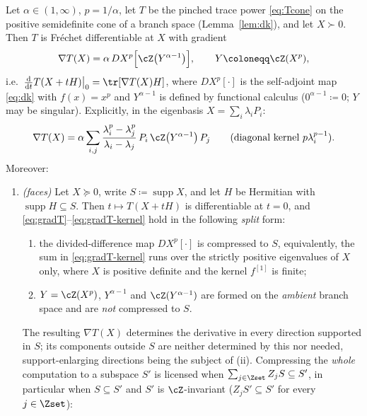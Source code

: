 \begin{theorem}\label{thm:gradient}
Let $\alpha\in(1,\infty)$, $p=1/\alpha$, let $T$ be the pinched trace
power \eqref{eq:Tcone} on the positive semidefinite cone of a branch space
(Lemma~\ref{lem:dk}), and let $X\succ0$. Then $T$ is Fr\'echet
differentiable at $X$ with gradient
\begin{equation}\label{eq:gradT}
  \nabla T(X)
  =\alpha\,D X^{p}\Big[\cZ\big(Y^{\alpha-1}\big)\Big],
  \qquad Y\coloneqq\cZ(X^{p}),
\end{equation}
i.e.\ $\frac{\mathrm d}{\mathrm dt}T(X+tH)\big|_0=\tr[\nabla T(X)H]$,
where $DX^{p}[\cdot]$ is the self-adjoint map \eqref{eq:dk} with
$f(x)=x^{p}$ and $Y^{\alpha-1}$ is defined by functional calculus
($0^{\alpha-1}\coloneqq0$; $Y$ may be singular). Explicitly, in the
eigenbasis $X=\sum_i\lambda_iP_i$:
\begin{equation}\label{eq:gradT-kernel}
  \nabla T(X)=\alpha\sum_{i,j}
  \frac{\lambda_i^{p}-\lambda_j^{p}}{\lambda_i-\lambda_j}\,
  P_i\,\cZ\big(Y^{\alpha-1}\big)\,P_j
  \qquad(\text{diagonal kernel }p\lambda_i^{p-1}).
\end{equation}
Moreover:
\begin{enumerate}[label=(\roman*),leftmargin=2.2em]
\item \emph{(faces)} Let $X\succeq0$, write
$S\coloneqq\operatorname{supp}X$, and let $H$ be Hermitian with
$\operatorname{supp}H\subseteq S$. Then $t\mapsto T(X+tH)$ is
differentiable at $t=0$, and \eqref{eq:gradT}--\eqref{eq:gradT-kernel}
hold in the following \emph{split} form:
\begin{enumerate}[label=(\alph*),leftmargin=2.2em]
\item the divided-difference map $DX^{p}[\cdot]$ is compressed to $S$,
equivalently, the sum in \eqref{eq:gradT-kernel} runs over the strictly
positive eigenvalues of $X$ only, where $X$ is positive definite and the
kernel $f^{[1]}$ is finite;
\item $Y=\cZ(X^{p})$, $Y^{\alpha-1}$ and $\cZ(Y^{\alpha-1})$ are formed on
the \emph{ambient} branch space and are \emph{not} compressed to $S$.
\end{enumerate}
The resulting $\nabla T(X)$ determines the derivative in every direction
supported in $S$; its components outside $S$ are neither determined by
this nor needed, support-enlarging directions being the subject of (ii).
Compressing the \emph{whole} computation to a subspace $S'$ is licensed
when $\sum_{j\in\Zset}Z_jS\subseteq S'$, in particular when $S\subseteq S'$
and $S'$ is $\cZ$-invariant ($Z_jS'\subseteq S'$ for every $j\in\Zset$):

\end{enumerate}
\end{theorem}
